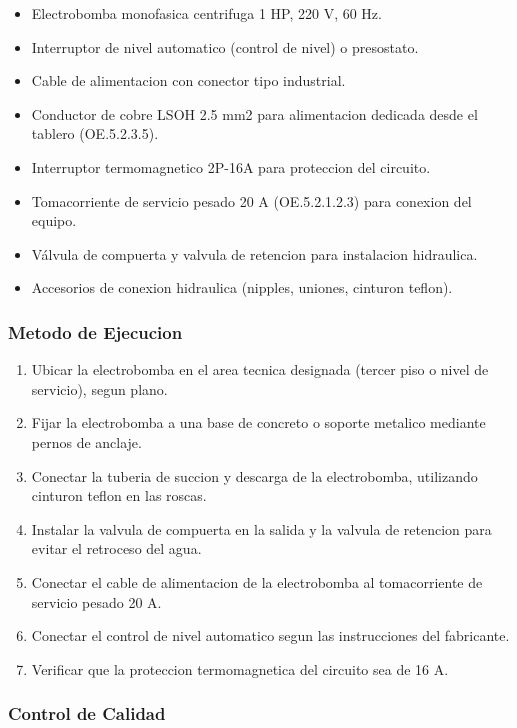 \begin{itemize}
  \item Electrobomba monofasica centrifuga 1 HP, 220 V, 60 Hz.
  \item Interruptor de nivel automatico (control de nivel) o presostato.
  \item Cable de alimentacion con conector tipo industrial.
  \item Conductor de cobre LSOH 2.5 mm2 para alimentacion dedicada desde el tablero (OE.5.2.3.5).
  \item Interruptor termomagnetico 2P-16A para proteccion del circuito.
  \item Tomacorriente de servicio pesado 20 A (OE.5.2.1.2.3) para conexion del equipo.
  \item Válvula de compuerta y valvula de retencion para instalacion hidraulica.
  \item Accesorios de conexion hidraulica (nipples, uniones, cinturon teflon).
\end{itemize}

\subsubsection{Metodo de Ejecucion}

\begin{enumerate}
  \item Ubicar la electrobomba en el area tecnica designada (tercer piso o nivel de servicio), segun plano.
  \item Fijar la electrobomba a una base de concreto o soporte metalico mediante pernos de anclaje.
  \item Conectar la tuberia de succion y descarga de la electrobomba, utilizando cinturon teflon en las roscas.
  \item Instalar la valvula de compuerta en la salida y la valvula de retencion para evitar el retroceso del agua.
  \item Conectar el cable de alimentacion de la electrobomba al tomacorriente de servicio pesado 20 A.
  \item Conectar el control de nivel automatico segun las instrucciones del fabricante.
  \item Verificar que la proteccion termomagnetica del circuito sea de 16 A.
\end{enumerate}

\subsubsection{Control de Calidad}

